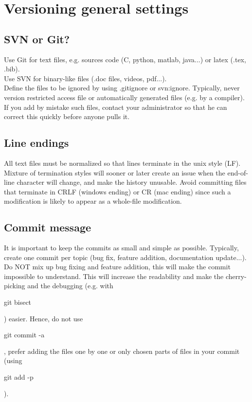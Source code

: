 \chapter{Versioning general settings}


\section{SVN or Git?}
Use Git for text files, e.g. sources code (C, python, matlab, java...) or latex (.tex, .bib).\\
Use SVN for binary-like files (.doc files, videos, pdf...).\\
Define the files to be ignored by using .gitignore or svn:ignore. 
Typically, never version restricted access file or automatically generated files (e.g. by a compiler).
If you add by mistake such files, contact your administrator so that he can correct this quickly before anyone pulls it.

%

\section{Line endings}
All text files must be normalized so that lines terminate in the unix style (LF).
Mixture of termination styles will sooner or later create an issue when the end-of-line character will change, and make the history unusable.
Avoid committing files that terminate in CRLF (windows ending) or CR (mac ending) since such a modification is likely to appear as a whole-file modification.

\section{Commit message}

It is important to keep the commits as small and simple as possible.
Typically, create one commit per topic (bug fix, feature addition,  documentation update...).
Do NOT mix up bug fixing and feature addition, this will make the commit impossible to understand.
This will increase the readability and make the cherry-picking and the debugging (e.g. with \begin{tt}git bisect\end{tt}) easier.
Hence, do not use \begin{tt}git commit -a\end{tt}, prefer adding the files one by one or only chosen parts of files in your commit (using \begin{tt}git add -p\end{tt}).

